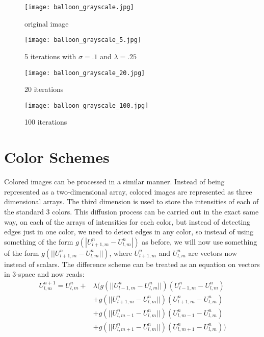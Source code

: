 \newpage
\vfill
\begin{figure}[ht]
\begin{minipage}[b]{0.45\linewidth}
\centering
\texttt{[image: balloon\_grayscale.jpg]}
\caption*{original image}
\end{minipage}
\hspace{0.5cm}
\begin{minipage}[b]{0.45\linewidth}
\centering
\texttt{[image: balloon\_grayscale\_5.jpg]}
\caption*{5 iterations with $\sigma = .1$ and $\lambda = .25$}
\end{minipage}
\begin{minipage}[b]{0.45\linewidth}
\centering
\texttt{[image: balloon\_grayscale\_20.jpg]}
\caption*{20 iterations}
\end{minipage}
\hspace{0.5cm}
\begin{minipage}[b]{0.45\linewidth}
\centering
\texttt{[image: balloon\_grayscale\_100.jpg]}
\caption*{100 iterations}
\end{minipage}
\end{figure}
\vfill
\clearpage

\section*{Color Schemes}

Colored images can be processed in a similar manner.
Instead of being represented as a two-dimensional array, colored images are represented as three dimensional arrays.
The third dimension is used to store the intensities of each of the standard 3 colors.
This diffusion process can be carried out in the exact same way, on each of the arrays of intensities for each color, but instead of detecting edges just in one color, we need to detect edges in any color, so instead of using something of the form $g(|U_{l+1,m}^n - U_{l,m}^n|)$ as before, we will now use something of the form $g(||U_{l+1,m}^n - U_{l,m}^n||)$, where $U_{l+1,m}^n$ and $U_{l,m}^n$ are vectors now instead of scalars.
The difference scheme can be treated as an equation on vectors in 3-space and now reads:
\begin{align*}
U_{l,m}^{n+1} = U_{l,m}^n + & \lambda (g(||U_{l-1,m}^n - U_{l,m}^n||)(U_{l-1,m}^n - U_{l,m}^n) \\
					& + g(||U_{l+1,m}^n - U_{l,m}^n||)(U_{l+1,m}^n - U_{l,m}^n) \\
					& + g(||U_{l,m-1}^n - U_{l,m}^n||)(U_{l,m-1}^n - U_{l,m}^n) \\
					& + g(||U_{l,m+1}^n - U_{l,m}^n||)(U_{l,m+1}^n - U_{l,m}^n))
\end{align*}

